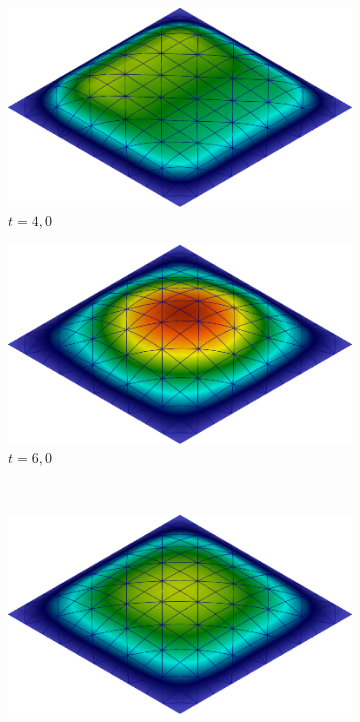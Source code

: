 \begin{figure}[h!]
    \centering
    \caption{Cavidade tridimensional - Deslocamento vertical da casca.}
    \begin{subfigure}[b]{0.35\textwidth}
        \centering
        \includegraphics[width=.9\linewidth]{Figuras/FSI-Cavity3D/d4.png}
        \caption{$t=4,0$}
    \end{subfigure}
    \begin{subfigure}[b]{0.35\textwidth}
        \centering
        \includegraphics[width=.9\linewidth]{Figuras/FSI-Cavity3D/d6.png}
        \caption{$t=6,0$}
    \end{subfigure}\\
    \begin{subfigure}[b]{0.35\textwidth}
        \centering
        \includegraphics[width=.9\linewidth]{Figuras/FSI-Cavity3D/d21-8.png}

\end{subfigure}
\end{figure}

